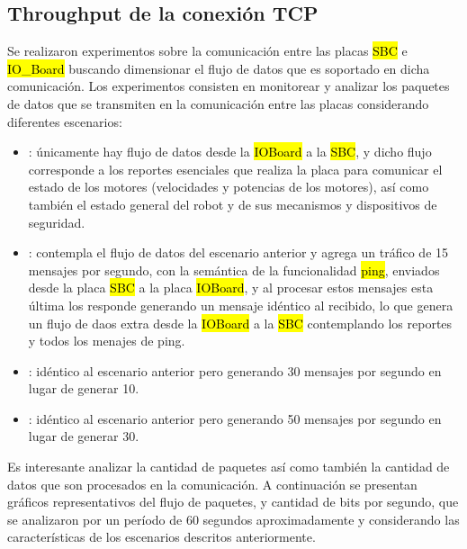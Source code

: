 \documentclass[withindex,glossary]{cam-thesis}
\begin{document}
\subsection{Throughput de la conexión TCP}
Se realizaron experimentos sobre la comunicación entre las placas \hl{SBC} e \hl{IO\_Board} buscando dimensionar el flujo de datos que es soportado en dicha comunicación.
Los experimentos consisten en monitorear y analizar los paquetes  de datos que se transmiten en la comunicación entre las placas considerando diferentes escenarios:
\begin{itemize}
	\item {}: únicamente hay flujo de datos desde la \hl{IOBoard} a la \hl{SBC}, y dicho flujo corresponde a los reportes esenciales que realiza la placa para comunicar el estado de los motores (velocidades y potencias de los motores), así como también el estado general del robot y de sus mecanismos y dispositivos de seguridad.
	\item {}: contempla el flujo de datos del escenario anterior y agrega un tráfico de 15 mensajes por segundo, con la semántica de la funcionalidad \hl{ping}, enviados desde la placa \hl{SBC} a la placa \hl{IOBoard}, y al procesar estos mensajes esta última los responde generando un mensaje idéntico al recibido, lo que genera un flujo de daos extra desde la \hl{IOBoard} a la \hl{SBC} contemplando los reportes y todos los menajes de ping.
	\item {}: idéntico al escenario anterior pero generando 30 mensajes por segundo en lugar de generar 10.
	\item {}: idéntico al escenario anterior pero generando 50 mensajes por segundo en lugar de generar 30.
\end{itemize}
Es interesante analizar la cantidad de paquetes así como también la cantidad de datos que son procesados en la comunicación. A continuación se presentan gráficos representativos del flujo de paquetes, y cantidad de bits por segundo, que se analizaron por un período de 60 segundos aproximadamente y considerando las características de los escenarios descritos anteriormente.
\end{document}
